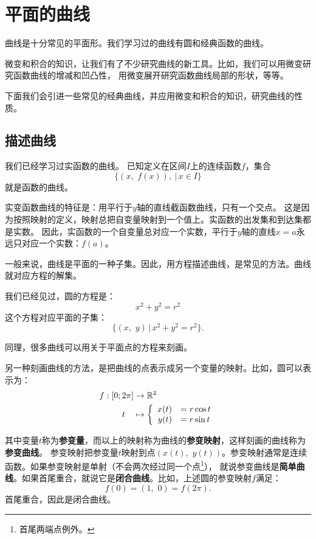 \documentclass[12pt,UTF8,fontset=none]{ctexbook}
\begin{document}
\chapter{平面的曲线}

曲线是十分常见的平面形。我们学习过的曲线有圆和经典函数的曲线。

微变和积合的知识，让我们有了不少研究曲线的新工具。比如，我们可以用微变研究函数曲线的增减和凹凸性，
用微变展开研究函数曲线局部的形状，等等。

下面我们会引进一些常见的经典曲线，并应用微变和积合的知识，研究曲线的性质。

\section{描述曲线}

我们已经学习过实函数的曲线。
已知定义在区间$I$上的连续函数$f$，集合
$$ \{(x,\,\,f(x)) ,\ | \, x\in I\}$$
就是函数的曲线。

实变函数曲线的特征是：用平行于$y$轴的直线截函数曲线，只有一个交点。
这是因为按照映射的定义，映射总把自变量映射到一个值上。实函数的出发集和到达集都是实数。
因此，实函数的一个自变量总对应一个实数，平行于$y$轴的直线$x = a$永远只对应一个实数：$f(a)$。

一般来说，曲线是平面的一种子集。因此，用方程描述曲线，是常见的方法。曲线就对应方程的解集。

我们已经见过，圆的方程是：
$$ x^2 + y^2 = r^2 $$
这个方程对应平面的子集：
$$ \{(x,\,\,y ) \, | \, x^2 + y^2 = r^2 \}.$$

同理，很多曲线可以用关于平面点的方程来刻画。

另一种刻画曲线的方法，是把曲线的点表示成另一个变量的映射。比如，圆可以表示为：
\begin{align*}
    f: [0;2\pi] &\rightarrow \mathbb{R}^2 \\
    t\quad &\mapsto\left\{
        \begin{array}[]{rl}
            x(t) &= r\cos{t} \\
            y(t) &= r\sin{t} \\
        \end{array}
    \right.
\end{align*}

其中变量$t$称为\textbf{参变量}，而以上的映射称为曲线的\textbf{参变映射}，这样刻画的曲线称为\textbf{参变曲线}。
参变映射把参变量$t$映射到点$(x(t),\,\, y(t))$。参变映射通常是连续函数。如果参变映射是单射（不会两次经过同一个点\footnote{首尾两端点例外。}），
就说参变曲线是\textbf{简单曲线}。如果首尾重合，就说它是\textbf{闭合曲线}。比如，上述圆的参变映射$f$满足：
$$ f(0) =  (1, \,\,0) = f(2\pi). $$
首尾重合，因此是闭合曲线。
\end{document}
